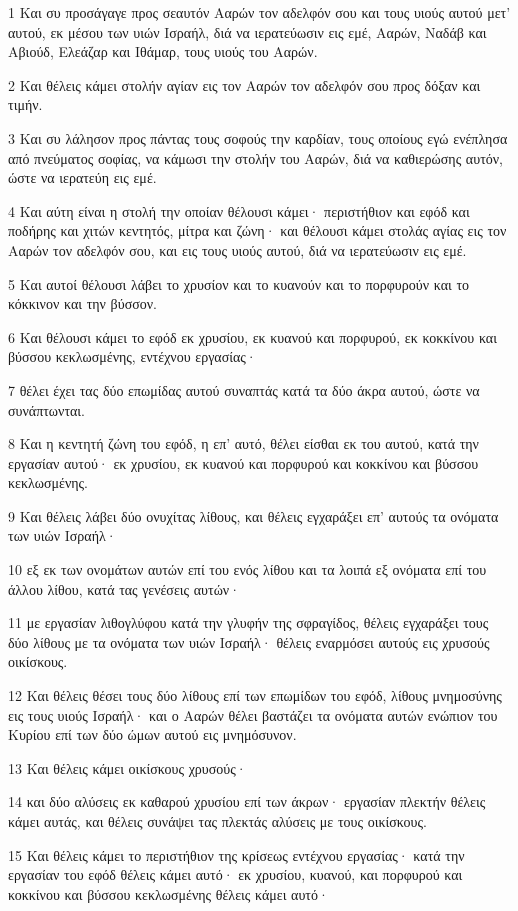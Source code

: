 \par 1 Και συ προσάγαγε προς σεαυτόν Ααρών τον αδελφόν σου και τους υιούς αυτού μετ' αυτού, εκ μέσου των υιών Ισραήλ, διά να ιερατεύωσιν εις εμέ, Ααρών, Ναδάβ και Αβιούδ, Ελεάζαρ και Ιθάμαρ, τους υιούς του Ααρών.
\par 2 Και θέλεις κάμει στολήν αγίαν εις τον Ααρών τον αδελφόν σου προς δόξαν και τιμήν.
\par 3 Και συ λάλησον προς πάντας τους σοφούς την καρδίαν, τους οποίους εγώ ενέπλησα από πνεύματος σοφίας, να κάμωσι την στολήν του Ααρών, διά να καθιερώσης αυτόν, ώστε να ιερατεύη εις εμέ.
\par 4 Και αύτη είναι η στολή την οποίαν θέλουσι κάμει· περιστήθιον και εφόδ και ποδήρης και χιτών κεντητός, μίτρα και ζώνη· και θέλουσι κάμει στολάς αγίας εις τον Ααρών τον αδελφόν σου, και εις τους υιούς αυτού, διά να ιερατεύωσιν εις εμέ.
\par 5 Και αυτοί θέλουσι λάβει το χρυσίον και το κυανούν και το πορφυρούν και το κόκκινον και την βύσσον.
\par 6 Και θέλουσι κάμει το εφόδ εκ χρυσίου, εκ κυανού και πορφυρού, εκ κοκκίνου και βύσσου κεκλωσμένης, εντέχνου εργασίας·
\par 7 θέλει έχει τας δύο επωμίδας αυτού συναπτάς κατά τα δύο άκρα αυτού, ώστε να συνάπτωνται.
\par 8 Και η κεντητή ζώνη του εφόδ, η επ' αυτό, θέλει είσθαι εκ του αυτού, κατά την εργασίαν αυτού· εκ χρυσίου, εκ κυανού και πορφυρού και κοκκίνου και βύσσου κεκλωσμένης.
\par 9 Και θέλεις λάβει δύο ονυχίτας λίθους, και θέλεις εγχαράξει επ' αυτούς τα ονόματα των υιών Ισραήλ·
\par 10 εξ εκ των ονομάτων αυτών επί του ενός λίθου και τα λοιπά εξ ονόματα επί του άλλου λίθου, κατά τας γενέσεις αυτών·
\par 11 με εργασίαν λιθογλύφου κατά την γλυφήν της σφραγίδος, θέλεις εγχαράξει τους δύο λίθους με τα ονόματα των υιών Ισραήλ· θέλεις εναρμόσει αυτούς εις χρυσούς οικίσκους.
\par 12 Και θέλεις θέσει τους δύο λίθους επί των επωμίδων του εφόδ, λίθους μνημοσύνης εις τους υιούς Ισραήλ· και ο Ααρών θέλει βαστάζει τα ονόματα αυτών ενώπιον του Κυρίου επί των δύο ώμων αυτού εις μνημόσυνον.
\par 13 Και θέλεις κάμει οικίσκους χρυσούς·
\par 14 και δύο αλύσεις εκ καθαρού χρυσίου επί των άκρων· εργασίαν πλεκτήν θέλεις κάμει αυτάς, και θέλεις συνάψει τας πλεκτάς αλύσεις με τους οικίσκους.
\par 15 Και θέλεις κάμει το περιστήθιον της κρίσεως εντέχνου εργασίας· κατά την εργασίαν του εφόδ θέλεις κάμει αυτό· εκ χρυσίου, κυανού, και πορφυρού και κοκκίνου και βύσσου κεκλωσμένης θέλεις κάμει αυτό·
